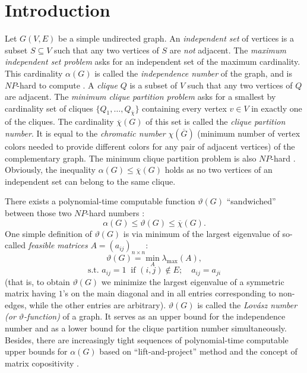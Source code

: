 \documentclass[11pt]{article}
\begin{document}
\section{Introduction}
Let $G(V,E)$ be a simple undirected graph.
An {\em independent set} of vertices is a subset $S \subseteq V$ such that any
two vertices of $S$ are {\em not} adjacent. The {\em maximum independent set
problem} asks for an independent set of the maximum cardinality. This
cardinality $\alpha(G)$ is called the {\em independence number\/} of the graph, 
and is $NP$-hard to compute \cite{GJ79}. A {\em clique\/} $Q$ is a subset of $V$ 
such that any two vertices of $Q$ are adjacent. The {\em minimum clique 
partition problem} asks for a smallest by cardinality set of cliques
$\{Q_1, \ldots, Q_{\overline{\chi}}\}$ containing every vertex $v \in V$ in exactly one 
of the cliques. The cardinality $\overline{\chi}(G)$ of this set is called the 
{\em clique partition number}. It is equal to the {\em chromatic number} 
$\chi(\overline{G})$ (minimum number of vertex colors
needed to provide different colors for any pair of adjacent vertices) of
the complementary graph. The minimum clique partition problem is also
$NP$-hard \cite{GJ79}. Obviously, the inequality
$\alpha(G) \le \overline{\chi}(G)$ holds as no two vertices of an independent
set can belong to the same clique.

There exists a polynomial-time computable function $\vartheta(G)$
``sandwiched'' between those two $NP$-hard numbers \cite{L79,K94}:
\begin{equation}
\label{eq:sandwich}
\alpha(G) \le \vartheta(G) \le \overline{\chi}(G).
\end{equation}
One simple definition of $\vartheta(G)$ is via minimum of the largest
eigenvalue of so-called {\em feasible matrices} $A=(a_{ij})_{n \times n}$:
\begin{equation}
\label{eq:theta_def}
\vartheta(G) = \min_A \lambda_{\max}(A),
\end{equation}
\[ \mbox{s.t. } a_{ij}=1 \ \mbox{ if } (i,j) \notin E; \quad a_{ij}=a_{ji} \]
(that is, to obtain $\vartheta(G)$ we minimize the largest eigenvalue of
a symmetric matrix having $1$'s on the main diagonal and in all entries
corresponding to non-edges, while the other entries are arbitrary). 
$\vartheta(G)$ is called the {\em Lov\'asz number (or $\vartheta$-function)} of
a graph. It serves as an upper bound for the independence number and as
a lower bound for the clique partition number simultaneously. Besides,
there are increasingly tight sequences of polynomial-time computable
upper bounds for $\alpha(G)$ based on ``lift-and-project'' method \cite{LS91}
and the concept of matrix copositivity \cite{KP01}.
\end{document}
